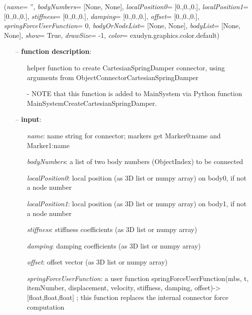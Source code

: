 %
\begin{flushleft}
\label{sec:mainsystemextensions:CreateCartesianSpringDamper}
({\it name}= '', {\it bodyNumbers}= [None, None], {\it localPosition0}= [0.,0.,0.], {\it localPosition1}= [0.,0.,0.], {\it stiffness}= [0.,0.,0.], {\it damping}= [0.,0.,0.], {\it offset}= [0.,0.,0.], {\it springForceUserFunction}= 0, {\it bodyOrNodeList}= [None, None], {\it bodyList}= [None, None], {\it show}= True, {\it drawSize}= -1, {\it color}= exudyn.graphics.color.default)
\end{flushleft}
\setlength{\itemindent}{0.7cm}
\begin{itemize}[leftmargin=0.7cm]
\item[--]
{\bf function description}: \vspace{-6pt}
\begin{itemize}[leftmargin=1.2cm]
\setlength{\itemindent}{-0.7cm}
\item[]helper function to create CartesianSpringDamper connector, using arguments from ObjectConnectorCartesianSpringDamper
\item[]- NOTE that this function is added to MainSystem via Python function MainSystemCreateCartesianSpringDamper.
\end{itemize}
\item[--]
{\bf input}: \vspace{-6pt}
\begin{itemize}[leftmargin=1.2cm]
\setlength{\itemindent}{-0.7cm}
\item[]{\it name}: name string for connector; markers get Marker0:name and Marker1:name
\item[]{\it bodyNumbers}: a list of two body numbers (ObjectIndex) to be connected
\item[]{\it localPosition0}: local position (as 3D list or numpy array) on body0, if not a node number
\item[]{\it localPosition1}: local position (as 3D list or numpy array) on body1, if not a node number
\item[]{\it stiffness}: stiffness coefficients (as 3D list or numpy array)
\item[]{\it damping}: damping coefficients (as 3D list or numpy array)
\item[]{\it offset}: offset vector (as 3D list or numpy array)
\item[]{\it springForceUserFunction}: a user function springForceUserFunction(mbs, t, itemNumber, displacement, velocity, stiffness, damping, offset)->[float,float,float] ; this function replaces the internal connector force computation

\end{itemize}
\end{itemize}
